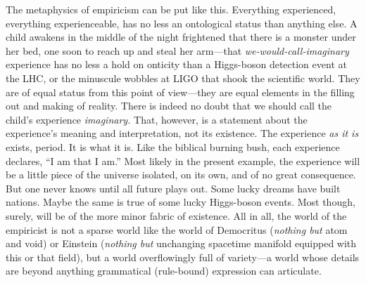 \documentclass[aps,pra,superscriptaddress,10pt,tightenlines,twocolumn,nofootinbib]{revtex4}
\begin{document}
The metaphysics of empiricism can be put like this.  Every\-thing experienced, everything experienceable, has no less an ontological status than anything else.  A child awakens in the middle of the night frightened that there is a monster under her bed, one soon to reach up and steal her arm---that {\it we-would-call-imaginary\/} experience has no less a hold on onticity than a Higgs-boson detection event at the LHC, or the minuscule wobbles at LIGO that shook the scientific world.  They are of equal status from this point of view---they are equal elements in the filling out and making of reality.  There is indeed no doubt that we should call the child's experience {\it imaginary.}  That, however, is a statement about the experience's meaning and interpretation, not its existence.  The ex\-pe\-rience {\it as it is\/} exists, period. It is what it is.  Like the biblical burning bush, each ex\-pe\-rience declares, ``I am that I am.''  Most likely in the present example, the experience will be a little piece of the universe isolated, on its own, and of no great consequence.  But one never knows until all future plays out.  Some lucky dreams have built nations.
Maybe the same is true of some lucky Higgs-boson events.  Most though, surely, will be of the more minor fabric of existence.  All in all, the world of the empiricist is not a sparse world like the world of Democritus ({\it nothing but\/} atom and void) or Einstein ({\it nothing but\/} unchanging spacetime manifold equipped with this or that field), but a world overflowingly full of variety---a world whose details are beyond anything grammatical (rule-bound) expression can articulate.
\end{document}
